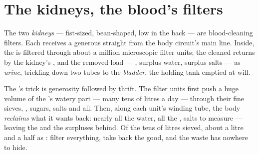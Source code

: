 \section{The kidneys, the blood's filters}

\begin{definition}\label{def:g7:removing-wastes:kidneys}
The two \emph{kidneys} --- fist-sized,
bean-shaped, low in the back --- are blood-cleaning
filters. Each receives a generous  straight from
the body circuit's main line. Inside, the  is
filtered through about a million microscopic filter
units; the cleaned  returns by the kidney's ,
and the removed load --- , surplus water, surplus
salts ---  as \emph{urine}, trickling
down two tubes to the \emph{bladder}, the
holding tank emptied at will.
\end{definition}

\begin{proposition}\label{prop:g7:removing-wastes:filter}
The 's trick is generosity followed by thrift. The
filter units first push a huge volume of the 's
watery part --- many tens of litres a day --- through
their fine sieves, , sugars, salts and all. Then,
along each unit's winding tube, the body \emph{reclaims}
what it wants back: nearly all the water, all the
, salts to measure --- leaving the  and the
surpluses behind. Of the tens of litres sieved, about a
litre and a half  as : filter everything,
take back the good, and the waste has nowhere to hide.
\end{proposition}
\admitted

